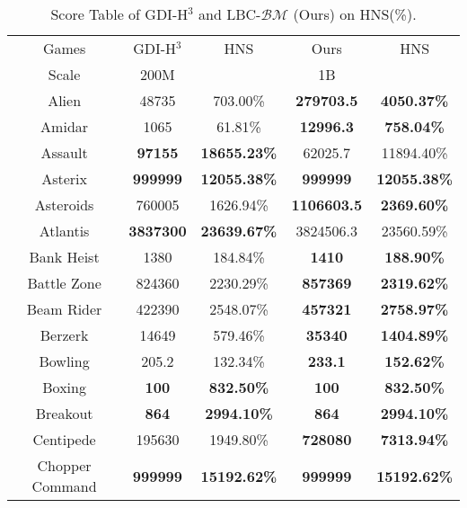 \clearpage  




\begin{table}[!hb]
\footnotesize
\begin{center}
\caption{Score Table of GDI-H$^3$ and LBC-$\mathcal{BM}$ (Ours) on HNS(\%).}
\label{Tab:Score table of GDI and LBC on HNS.}
\setlength{\tabcolsep}{1.0pt}
\begin{tabular}{c cc cc }
\toprule
Games & GDI-H$^3$ & HNS & Ours & HNS   \\ 
        Scale & 200M & ~ & 1B &    \\  \midrule
        Alien & 48735	             &703.00\% & \textbf{279703.5} & \textbf{4050.37\%} \\  
        Amidar &1065              &61.81\% & \textbf{12996.3} & \textbf{758.04\%} \\  
        Assault &\textbf{97155}	             &\textbf{18655.23\%}  & 62025.7 & 11894.40\% \\  
        Asterix &\textbf{{999999}}   &\textbf{{12055.38\%}} & \textbf{999999} & \textbf{12055.38\%} \\  
        Asteroids &{760005}            &{1626.94\%}  & \textbf{1106603.5} & \textbf{2369.60\%} \\  
        Atlantis &\textbf{{3837300}}           &\textbf{{23639.67\%}}   & 3824506.3 & 23560.59\% \\  
        Bank Heist &1380              &184.84\%  & \textbf{1410} & \textbf{188.90\%} \\  
        Battle Zone &824360            &2230.29\% & \textbf{857369} & \textbf{2319.62\%} \\  
        Beam Rider &422390            &2548.07\% & \textbf{457321} & \textbf{2758.97\%} \\  
        Berzerk &14649             &579.46\% & \textbf{35340} & \textbf{1404.89\%} \\  
        Bowling &205.2             &132.34\% & \textbf{233.1} & \textbf{152.62\%} \\  
        Boxing &\textbf{{100}}      &\textbf{{832.50\%}}   & \textbf{100} & \textbf{832.50\%} \\  
        Breakout &\textbf{{864}}      &\textbf{{2994.10\%}} & \textbf{864} & \textbf{2994.10\%} \\  
        Centipede &195630            &1949.80\% & \textbf{728080} & \textbf{7313.94\%} \\  
        Chopper Command &\textbf{{999999}}   &\textbf{{15192.62\%}} & \textbf{999999} & \textbf{15192.62\%} \\  

\end{tabular}
\end{center}
\end{table}
